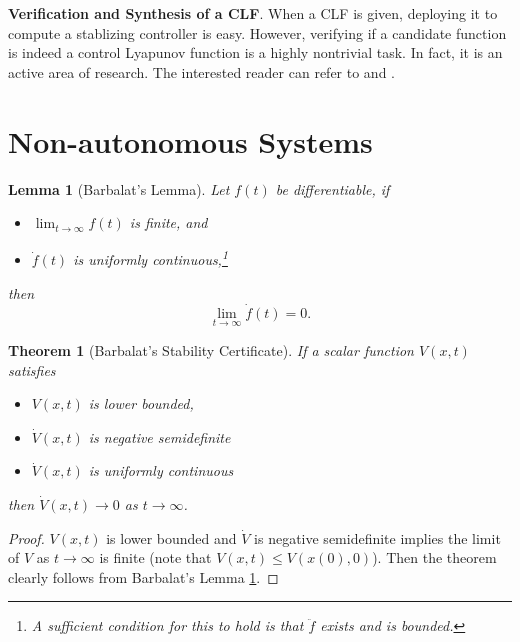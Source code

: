 \documentclass[
]{book}
\newtheorem{theorem}{Theorem}[chapter]
\newtheorem{lemma}{Lemma}[chapter]
\theoremstyle{definition}
\theoremstyle{definition}
\theoremstyle{definition}
\theoremstyle{definition}
\theoremstyle{remark}
\begin{document}
\textbf{Verification and Synthesis of a CLF}. When a CLF is given, deploying it to compute a stablizing controller is easy. However, verifying if a candidate function is indeed a control Lyapunov function is a highly nontrivial task. In fact, it is an active area of research. The interested reader can refer to \citep{kang23cdc-verification} and \citep{dai23acc-convex}.

\hypertarget{non-autonomous-systems}{%
\section{Non-autonomous Systems}\label{non-autonomous-systems}}

\begin{lemma}[Barbalat's Lemma]
\protect\hypertarget{lem:Barbalat}{}\label{lem:Barbalat}Let \(f(t)\) be differentiable, if

\begin{itemize}
\item
  \(\lim_{t \rightarrow \infty} f(t)\) is finite, and
\item
  \(\dot{f}(t)\) is uniformly continuous,\footnote{A sufficient condition for this to hold is that \(\ddot{f}\) exists and is bounded.}
\end{itemize}

then
\[
\lim_{t \rightarrow \infty} \dot{f}(t) = 0.
\]
\end{lemma}

\begin{theorem}[Barbalat's Stability Certificate]
\protect\hypertarget{thm:BarbalatStability}{}\label{thm:BarbalatStability}If a scalar function \(V(x,t)\) satisfies

\begin{itemize}
\item
  \(V(x,t)\) is lower bounded,
\item
  \(\dot{V}(x,t)\) is negative semidefinite
\item
  \(\dot{V}(x,t)\) is uniformly continuous
\end{itemize}

then \(\dot{V}(x,t) \rightarrow 0\) as \(t \rightarrow \infty\).
\end{theorem}

\begin{proof}
\(V(x,t)\) is lower bounded and \(\dot{V}\) is negative semidefinite implies the limit of \(V\) as \(t \rightarrow \infty\) is finite (note that \(V(x,t) \leq V(x(0),0)\)). Then the theorem clearly follows from Barbalat's Lemma \ref{lem:Barbalat}.
\end{proof}
\end{document}
